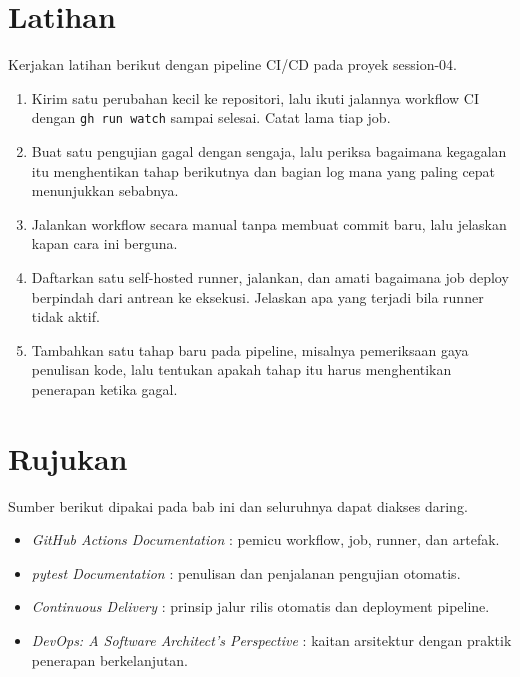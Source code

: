 \section{Latihan}

Kerjakan latihan berikut dengan pipeline CI/CD pada proyek session-04.

\begin{enumerate}
  \item Kirim satu perubahan kecil ke repositori, lalu ikuti jalannya workflow CI dengan \texttt{gh run watch} sampai selesai. Catat lama tiap job.
  \item Buat satu pengujian gagal dengan sengaja, lalu periksa bagaimana kegagalan itu menghentikan tahap berikutnya dan bagian log mana yang paling cepat menunjukkan sebabnya.
  \item Jalankan workflow secara manual tanpa membuat commit baru, lalu jelaskan kapan cara ini berguna.
  \item Daftarkan satu self-hosted runner, jalankan, dan amati bagaimana job deploy berpindah dari antrean ke eksekusi. Jelaskan apa yang terjadi bila runner tidak aktif.
  \item Tambahkan satu tahap baru pada pipeline, misalnya pemeriksaan gaya penulisan kode, lalu tentukan apakah tahap itu harus menghentikan penerapan ketika gagal.
\end{enumerate}

\section{Rujukan}

Sumber berikut dipakai pada bab ini dan seluruhnya dapat diakses daring.

\begin{itemize}
  \item \textit{GitHub Actions Documentation} \cite{doc-gh-actions}: pemicu workflow, job, runner, dan artefak.
  \item \textit{pytest Documentation} \cite{doc-pytest}: penulisan dan penjalanan pengujian otomatis.
  \item \textit{Continuous Delivery} \cite{humble2010cd}: prinsip jalur rilis otomatis dan deployment pipeline.
  \item \textit{DevOps: A Software Architect's Perspective} \cite{bass2015devops}: kaitan arsitektur dengan praktik penerapan berkelanjutan.
\end{itemize}
